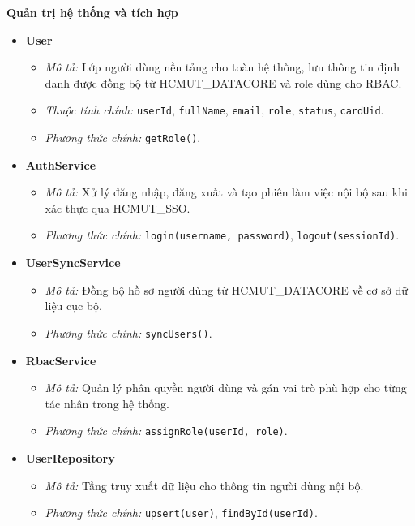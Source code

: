 \noindent\textbf{Quản trị hệ thống và tích hợp}
\begin{itemize}[leftmargin=1.5cm]
    \item \textbf{User}
    \begin{itemize}
        \item \textit{Mô tả:} Lớp người dùng nền tảng cho toàn hệ thống, lưu thông tin định danh được đồng bộ từ HCMUT\_DATACORE và role dùng cho RBAC.
        \item \textit{Thuộc tính chính:} \texttt{userId}, \texttt{fullName}, \texttt{email}, \texttt{role}, \texttt{status}, \texttt{cardUid}.
        \item \textit{Phương thức chính:} \texttt{getRole()}.
    \end{itemize}

    \item \textbf{AuthService}
    \begin{itemize}
        \item \textit{Mô tả:} Xử lý đăng nhập, đăng xuất và tạo phiên làm việc nội bộ sau khi xác thực qua HCMUT\_SSO.
        \item \textit{Phương thức chính:} \texttt{login(username, password)}, \texttt{logout(sessionId)}.
    \end{itemize}

    \item \textbf{UserSyncService}
    \begin{itemize}
        \item \textit{Mô tả:} Đồng bộ hồ sơ người dùng từ HCMUT\_DATACORE về cơ sở dữ liệu cục bộ.
        \item \textit{Phương thức chính:} \texttt{syncUsers()}.
    \end{itemize}

    \item \textbf{RbacService}
    \begin{itemize}
        \item \textit{Mô tả:} Quản lý phân quyền người dùng và gán vai trò phù hợp cho từng tác nhân trong hệ thống.
        \item \textit{Phương thức chính:} \texttt{assignRole(userId, role)}.
    \end{itemize}

    \item \textbf{UserRepository}
    \begin{itemize}
        \item \textit{Mô tả:} Tầng truy xuất dữ liệu cho thông tin người dùng nội bộ.
        \item \textit{Phương thức chính:} \texttt{upsert(user)}, \texttt{findById(userId)}.
    \end{itemize}


\end{itemize}
